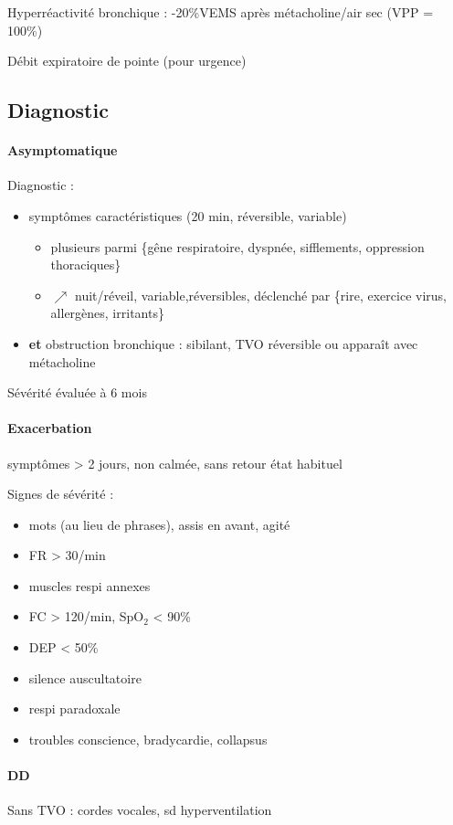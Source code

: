 Hyperréactivité bronchique : -20\%VEMS après métacholine/air sec (VPP = 100\%)

Débit expiratoire de pointe (pour urgence)

\subsection{Diagnostic}
\paragraph{Asymptomatique}
Diagnostic :
\begin{itemize}
\item symptômes caractéristiques (20 min, réversible, variable)
  \begin{itemize}
    \item plusieurs parmi \{gêne respiratoire, dyspnée,
        sifflements, oppression thoraciques\}
    \item $\nearrow$ nuit/réveil, variable,réversibles, déclenché par \{rire, exercice
      virus, allergènes, irritants\}
    \end{itemize}
\item \textbf{et} obstruction bronchique : sibilant, TVO réversible ou apparaît avec métacholine
\end{itemize}
Sévérité évaluée à 6 mois
\paragraph{Exacerbation}
\nearrow{} symptômes > 2 jours, non calmée, sans retour état habituel

Signes de sévérité :
\begin{itemize}
\item mots (au lieu de phrases), assis en avant, agité
\item FR > 30/min
\item muscles respi annexes
\item FC > 120/min, SpO\(_{\text{2}}\) < 90\%
\item DEP < 50\%
\item silence auscultatoire \skull
\item respi paradoxale \skull
\item troubles conscience, bradycardie, collapsus \skull
\end{itemize}
\paragraph{DD}
Sans TVO : cordes vocales, sd hyperventilation

